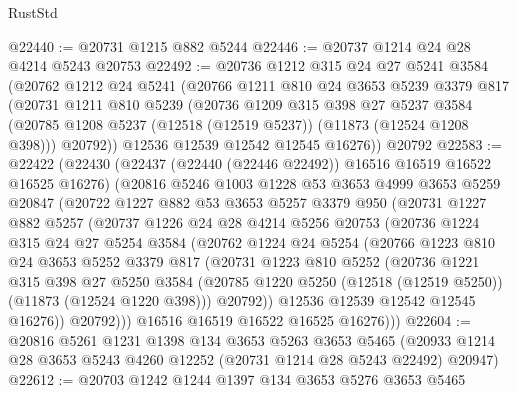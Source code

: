\begin{lexlean}{RustStd}
\begin{coremodule}
@22440 := @20731 @1215 @882 @5244
@22446 := @20737 @1214 @24 @28 @4214 @5243 @20753
@22492 := @20736
    @1212
    @315
    @24
    @27
    @5241
    @3584
    (@20762
      @1212
      @24
      @5241
      (@20766
        @1211
        @810
        @24
        @3653
        @5239
        @3379
        @817
        (@20731
          @1211
          @810
          @5239
          (@20736
            @1209
            @315
            @398
            @27
            @5237
            @3584
            (@20785 @1208 @5237 (@12518 (@12519 @5237)) (@11873 (@12524 @1208 @398)))
            @20792))
        @12536
        @12539
        @12542
        @12545
        @16276))
    @20792
@22583 := @22422
    (@22430
      (@22437 (@22440 (@22446 @22492)) @16516 @16519 @16522 @16525 @16276)
      (@20816
        @5246
        @1003
        @1228
        @53
        @3653
        @4999
        @3653
        @5259
        @20847
        (@20722
          @1227
          @882
          @53
          @3653
          @5257
          @3379
          @950
          (@20731
            @1227
            @882
            @5257
            (@20737
              @1226
              @24
              @28
              @4214
              @5256
              @20753
              (@20736
                @1224
                @315
                @24
                @27
                @5254
                @3584
                (@20762
                  @1224
                  @24
                  @5254
                  (@20766
                    @1223
                    @810
                    @24
                    @3653
                    @5252
                    @3379
                    @817
                    (@20731
                      @1223
                      @810
                      @5252
                      (@20736
                        @1221
                        @315
                        @398
                        @27
                        @5250
                        @3584
                        (@20785 @1220 @5250 (@12518 (@12519 @5250)) (@11873 (@12524 @1220 @398)))
                        @20792))
                    @12536
                    @12539
                    @12542
                    @12545
                    @16276))
                @20792)))
          @16516
          @16519
          @16522
          @16525
          @16276)))
@22604 := @20816
    @5261
    @1231
    @1398
    @134
    @3653
    @5263
    @3653
    @5465
    (@20933 @1214 @28 @3653 @5243 @4260 @12252 (@20731 @1214 @28 @5243 @22492) @20947)
@22612 := @20703 @1242 @1244 @1397 @134 @3653 @5276 @3653 @5465

\end{coremodule}
\end{lexlean}
